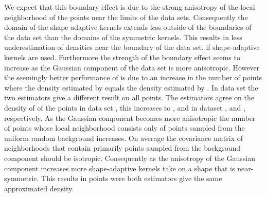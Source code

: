 			We expect that this boundary effect is due to the strong anisotropy of the local neighborhood of the points near the limits of the data sets. Consequently the domain of the shape-adaptive kernels extends less outside of the boundaries of the data set than the domains of the symmetric kernels. This results in less underestimation of densities near the boundary of the data set, if shape-adaptive kernels are used.
			Furthermore the strength of the boundary effect seems to increase as the Gaussian component of the data set is more anisotropic. However the seemingly better performance of \sambe is due to an increase in the number of points where the density estimated by \sambe equals the density estimated by \mbe. In data set \ferdosiOne the two estimators give a different result on all points. The estimators agree on the density of  of the points in data set \baakmanOne, this increases to , and  in dataset \baakmanFour, and \baakmanFive, respectively.
			As the Gaussian component becomes more anisotropic the number of points whose local neighborhood consists only of points sampled from the uniform random background increases. On average the covariance matrix of neighborhoods that contain primarily points sampled from the background component should be isotropic. Consequently as the anisotropy of the Gaussian component increases more shape-adaptive kernels take on a shape that is near-symmetric. This results in points were both estimators give the same approximated density.


